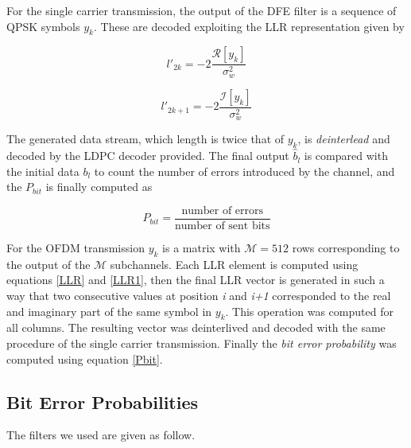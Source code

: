 \documentclass[a4paper, 12pt]{report}
\begin{document}
\vspace{5em}

For the single carrier transmission, the output of the DFE filter is a sequence of QPSK symbols $y_k$. These are decoded exploiting the LLR representation given by 

\begin{equation}\label{LLR}
l'_{2k} = -2\frac{\mathcal{R}[y_k]}{\sigma_w^2}
\end{equation}

\begin{equation}\label{LLR1}
l'_{2k+1} = -2\frac{\mathcal{I}[y_k]}{\sigma_w^2}
\end{equation}

The generated data stream, which length is twice that of $y_k$, is \textit{deinterlead} and decoded by the LDPC decoder provided. The final output $\hat{b}_l$ is compared with the initial data $b_l$ to count the number of errors introduced by the channel, and the $P_{bit}$ is finally computed as 

\begin{equation}\label{Pbit}
P_{bit} = \frac{\text{number of errors}}{\text{number of sent bits}}
\end{equation}

For the OFDM transmission $y_k$ is a matrix with $\mathcal{M}=512$ rows corresponding to the output of the $\mathcal{M}$ subchannels. Each LLR element is computed using equations \ref{LLR} and \ref{LLR1}, then the final LLR vector is generated in such a way that two consecutive values at position \textit{i} and \textit{i+1} corresponded to the real and imaginary part of the same symbol in $y_k$. This operation was computed for all columns. The resulting vector was deinterlived and decoded with the same procedure of the single carrier transmission. Finally the \textit{bit error probability} was computed using equation \ref{Pbit}.

\subsection*{Bit Error Probabilities}


\clearpage
The filters we used are given as follow.
\end{document}
